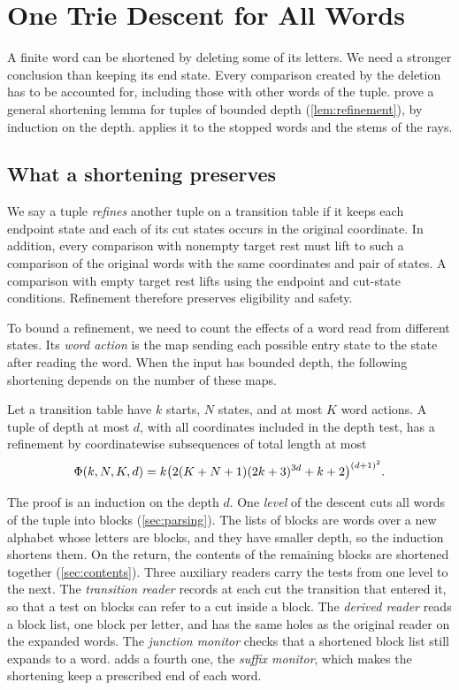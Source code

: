 \section{One Trie Descent for All Words}
\label{sec:trie}

A finite word can be shortened by deleting some of its letters. We need
a stronger conclusion than keeping its end state. Every comparison
created by the deletion has to be accounted for, including those with
other words of the tuple. 
prove a general shortening lemma for tuples of bounded depth
(\cref{lem:refinement}), by induction on the depth. 
applies it to the stopped words and the stems of the rays.

\subsection{What a shortening preserves}
\label{sec:refinement}

We say a tuple \emph{refines} another tuple on a transition table if
it keeps each endpoint state and each of its cut states occurs in the
original coordinate. In addition, every comparison with nonempty target
rest must lift to such a comparison of the original words with the same
coordinates and pair of states. A comparison with empty target rest
lifts using the endpoint and cut-state conditions. Refinement therefore
preserves eligibility and safety.

To bound a refinement, we need to count the effects of a word read from
different states. Its \emph{word action} is the map sending each possible
entry state to the state after reading the word. When the input has
bounded depth, the following shortening depends on the number of these
maps.

\begin{lemma}\label{lem:refinement}
Let a transition table have $k$ starts, $N$ states, and at most $K$
word actions. A tuple of depth at most $d$, with all coordinates
included in the depth test, has a refinement by coordinatewise
subsequences of total length at most
\[
 \Phi(k,N,K,d)
   = k\bigl(2(K+N+1)(2k+3)^{3d}+k+2\bigr)^{(d+1)^2}.
\]
\end{lemma}

The proof is an induction on the depth $d$. One \emph{level} of the
descent cuts all words of the tuple into blocks (\cref{sec:parsing}). The
lists of blocks are words over a new alphabet whose letters are blocks,
and they have smaller depth, so the induction shortens them. On the return,
the contents of the remaining blocks are shortened together
(\cref{sec:contents}). Three auxiliary readers carry the tests from one
level to the next. The \emph{transition reader} records at each cut the
transition that entered it, so that a test on blocks can refer to a cut
inside a block. The \emph{derived reader} reads a block list, one block per
letter, and has the same holes as the original reader on the expanded
words. The \emph{junction monitor} checks that a shortened block list still
expands to a word.  adds a fourth one, the \emph{suffix
monitor}, which makes the shortening keep a prescribed end of each word.

